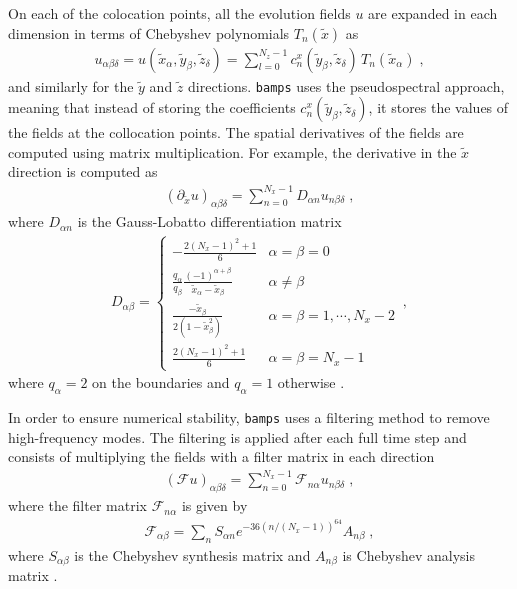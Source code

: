 On each of the colocation points, all the evolution fields $u$ are expanded in each dimension in terms of Chebyshev polynomials $T_n(\tilde{x})$ as
%
\begin{align}
    u_{\alpha \beta \delta} = u(\tilde{x}_\alpha, \tilde{y}_\beta, \tilde{z}_\delta) = \sum_{l=0}^{N_z -1} c^x_n(\tilde{y}_\beta, \tilde{z}_\delta) \, T_n(\tilde{x}_\alpha) \; ,
\end{align}
%
and similarly for the $\tilde{y}$ and $\tilde{z}$ directions. \texttt{bamps} uses the pseudospectral approach, meaning that instead of storing the coefficients $c^x_n(\tilde{y}_\beta, \tilde{z}_\delta)$, it stores the values of the fields at the collocation points. The spatial derivatives of the fields are computed using matrix multiplication. For example, the derivative in the $\tilde{x}$ direction is computed as
%
\begin{align}
    (\partial_{\tilde{x}} u)_{\alpha \beta \delta} = \sum_{n=0}^{N_x -1} D_{\alpha n} u_{n \beta \delta} \; ,
\end{align}
%
where $D_{\alpha n}$ is the Gauss-Lobatto differentiation matrix
%
\begin{align}
    D_{\alpha\beta}=
    \begin{cases}
    -\frac{2(N_x-1)^2+1}{6} & \alpha=\beta=0 \\
    \frac{q_\alpha}{q_\beta}\frac{(-1)^{\alpha+\beta}}{\tilde{x}_\alpha-\tilde{x}_\beta} & \alpha\neq\beta \\
    \frac{-\tilde{x}_\beta}{2(1-\tilde{x}_\beta^2)} & \alpha=\beta=1,\cdots,N_x-2 \\
    \frac{2(N_x-1)^2+1}{6} & \alpha=\beta=N_x-1
    \end{cases} \, ,
\end{align}
%
where $q_\alpha = 2$ on the boundaries and $q_\alpha = 1$ otherwise \cite{Pseudospectral_method_for_gravitational_wave_collapse}.

In order to ensure numerical stability, \texttt{bamps} uses a filtering method to remove high-frequency modes. The filtering is applied after each full time step and consists of multiplying the fields with a filter matrix in each direction
%
\begin{align}
    (\mathcal{F}u)_{\alpha \beta \delta} = \sum_{n=0}^{N_x -1} \mathcal{F}_{n \alpha} u_{n \beta \delta} \; ,
\end{align}
%
where the filter matrix $\mathcal{F}_{n \alpha}$ is given by
%
\begin{align}
    \mathcal{F}_{\alpha \beta} = \sum_n S_{\alpha n} e^{-36 (n/(N_x - 1))^{64}} A_{n \beta} \; ,
\end{align}
%
where $S_{\alpha \beta}$ is the Chebyshev synthesis matrix and $A_{n \beta}$ is Chebyshev analysis matrix \cite{Pseudospectral_method_for_gravitational_wave_collapse}.

